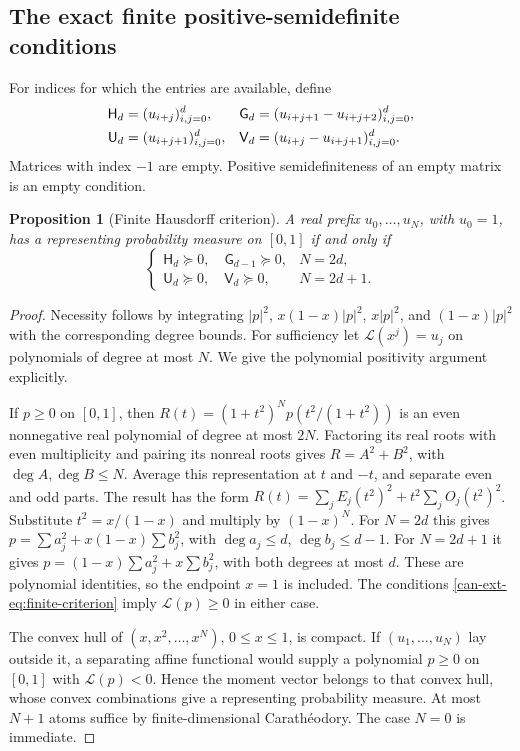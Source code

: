 \documentclass[11pt,a4paper]{article}
\numberwithin{equation}{section}
\newtheorem{proposition}[theorem]{Proposition}
\theoremstyle{definition}
\theoremstyle{remark}
\begin{document}
\subsection{The exact finite positive-semidefinite conditions}

For indices for which the entries are available, define
\begin{align}
 \mathsf H_d&=(u_{i+j})_{i,j=0}^d,&
 \mathsf G_d&=(u_{i+j+1}-u_{i+j+2})_{i,j=0}^d,\notag\\
 \mathsf U_d&=(u_{i+j+1})_{i,j=0}^d,&
 \mathsf V_d&=(u_{i+j}-u_{i+j+1})_{i,j=0}^d.
 \label{can-ext-eq:matrices}
\end{align}
Matrices with index $-1$ are empty. Positive semidefiniteness of an
empty matrix is an empty condition.

\begin{proposition}[Finite Hausdorff criterion]
\label{can-ext-prop:finite-criterion}
A real prefix $u_0,\ldots,u_N$, with $u_0=1$, has a representing
probability measure on $[0,1]$ if and only if
\begin{equation}\label{can-ext-eq:finite-criterion}
 \begin{cases}
  \mathsf H_d\succeq0,\quad\mathsf G_{d-1}\succeq0,&N=2d,\\
  \mathsf U_d\succeq0,\quad\mathsf V_d\succeq0,&N=2d+1.
 \end{cases}
\end{equation}
\end{proposition}
\begin{proof}
Necessity follows by integrating $|p|^2$, $x(1-x)|p|^2$, $x|p|^2$,
and $(1-x)|p|^2$ with the corresponding degree bounds.
For sufficiency let $\mathcal L(x^j)=u_j$ on polynomials of degree
at most $N$. We give the polynomial positivity argument explicitly.

If $p\geq0$ on $[0,1]$, then
$R(t)=(1+t^2)^Np(t^2/(1+t^2))$ is an even nonnegative real
polynomial of degree at most $2N$. Factoring its real roots with
even multiplicity and pairing its nonreal roots gives
$R=A^2+B^2$, with $\deg A,\deg B\leq N$.
Average this representation at $t$ and $-t$, and separate even and
odd parts. The result has the form
$R(t)=\sum_jE_j(t^2)^2+t^2\sum_jO_j(t^2)^2$.
Substitute $t^2=x/(1-x)$ and multiply by $(1-x)^N$.
For $N=2d$ this gives
$p=\sum a_j^2+x(1-x)\sum b_j^2$, with
$\deg a_j\leq d$, $\deg b_j\leq d-1$.
For $N=2d+1$ it gives
$p=(1-x)\sum a_j^2+x\sum b_j^2$, with both degrees at most $d$.
These are polynomial identities, so the endpoint $x=1$ is included.
The conditions \eqref{can-ext-eq:finite-criterion} imply
$\mathcal L(p)\geq0$ in either case.

The convex hull of $(x,x^2,\ldots,x^N)$, $0\leq x\leq1$, is
compact. If $(u_1,\ldots,u_N)$ lay outside it, a separating affine
functional would supply a polynomial $p\geq0$ on $[0,1]$ with
$\mathcal L(p)<0$. Hence the moment vector belongs to that convex
hull, whose convex combinations give a representing probability
measure. At most $N+1$ atoms suffice by finite-dimensional
Carath\'eodory. The case $N=0$ is immediate.
\end{proof}
\end{document}
